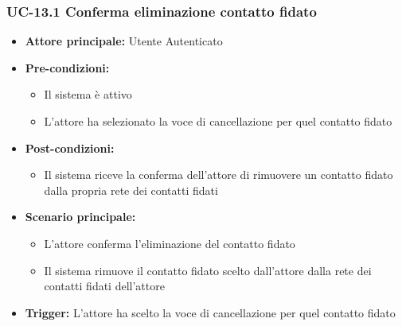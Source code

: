 \documentclass[a4paper,12pt]{article}
\begin{document}
\subsubsection{UC-13.1 Conferma eliminazione contatto fidato} \label{subsec:UC-13.1}
\begin{itemize}
    \item \textbf{Attore principale:} Utente Autenticato
    \item \textbf{Pre-condizioni:}
    \begin{itemize}
        \item Il sistema è attivo
        \item L'attore ha selezionato la voce di cancellazione per quel contatto fidato
    \end{itemize}
    \item \textbf{Post-condizioni:}
    \begin{itemize}
        \item Il sistema riceve la conferma dell'attore di rimuovere un contatto fidato dalla propria rete dei contatti fidati
    \end{itemize}
    \item \textbf{Scenario principale:}
    \begin{itemize}
        \item L'attore conferma l'eliminazione del contatto fidato
        \item Il sistema rimuove il contatto fidato scelto dall'attore dalla rete dei contatti fidati dell'attore
    \end{itemize}
    \item \textbf{Trigger:} L'attore ha scelto la voce di cancellazione per quel contatto fidato
\end{itemize}

\end{document}
